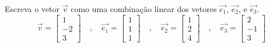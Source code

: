 \begin{exeresol}
Escreva o vetor $\vec{v}$ como uma combinação linear dos vetores $\vec{e_1}$, $\vec{e_2}$, e $\vec{e_3}$.
\begin{equation}
 \vec{v} = 
\left[
  \begin{array}{c}
  1 \\
  -2 \\
  3
 \end{array}
\right] \quad , \quad
 \vec{e_1} = 
  \left[
  \begin{array}{c}
  1 \\
  1 \\
  1
 \end{array}
\right] \quad , \quad
 \vec{e_2} = 
  \left[
  \begin{array}{c}
  1 \\
  2 \\
  4
 \end{array}
\right] \quad , \quad
 \vec{e_3} = 
  \left[
  \begin{array}{c}
  2 \\
  -1 \\
  3
 \end{array}
\right]
\end{equation}
\end{exeresol}

